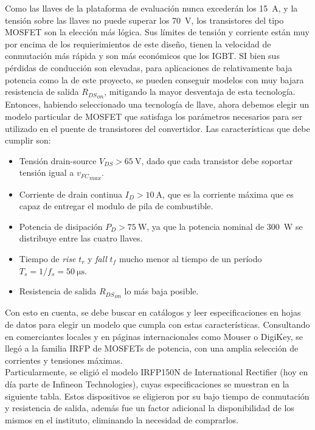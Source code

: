 Como las llaves de la plataforma de evaluación nunca excederán los \SI[]{15}[]{\ampere}, y la tensión sobre las llaves no puede superar los \SI[]{70}[]{\volt}, los transistores del tipo MOSFET son la elección más lógica. Sus límites de tensión y corriente están muy por encima de los requierimientos de este diseño, tienen la velocidad de conmutación más rápida y son más económicos que los IGBT. SI bien sus pérdidas de conducción son elevadas, para aplicaciones de relativamente baja potencia como la de este proyecto, se pueden conseguir modelos con muy bajara resistencia de salida ${R_{DS}}_{on}$, mitigando la mayor desventaja de esta tecnología.\\

Entonces, habiendo seleccionado una tecnología de llave, ahora debemos elegir un modelo particular de MOSFET que satisfaga los parámetros necesarios para ser utilizado en el puente de transistores del convertidor. Las características que debe cumplir son:

\begin{itemize}
    \item Tensión drain-source $V_{DS} > \SI[]{65}[]{\volt}$, dado que cada transistor debe soportar tensión igual a ${v_{FC}}_{max}$.
    \item Corriente de drain continua $I_D > \SI[]{10}[]{\ampere}$, que es la corriente máxima que es capaz de entregar el modulo de pila de combustible.
    \item Potencia de disipación $P_D > \SI[]{75}[]{\watt}$, ya que la potencia nominal de \SI[]{300}[]{\watt} se distribuye entre las cuatro llaves.
    \item Tiempo de \textit{rise} $t_r$ y \textit{fall} $t_f$ mucho menor al tiempo de un período $T_s = 1/f_s = \SI[]{50}[]{\micro\second}$.
    \item Resistencia de salida ${R_{DS}}_{on}$ lo más baja posible.
\end{itemize}

Con esto en cuenta, se debe buscar en catálogos y leer especificaciones en hojas de datos para elegir un modelo que cumpla con estas características. Consultando en comerciantes locales y en páginas internacionales como Mouser o DigiKey, se llegó a la familia IRFP de MOSFETs de potencia, con una amplia selección de corrientes y tensiones máximas.\\

Particularmente, se eligió el modelo {\Medium IRFP150N de International Rectifier} (hoy en día parte de Infineon Technologies), cuyas especificaciones se muestran en la siguiente tabla. Estos dispositivos se eligieron por su bajo tiempo de conmutación y resistencia de salida, además fue un factor adicional la disponibilidad de los mismos en el instituto, eliminando la necesidad de comprarlos.\\

